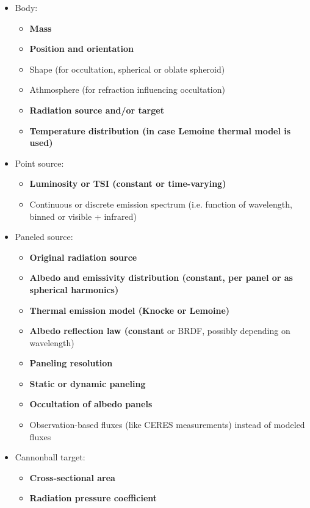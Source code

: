 \documentclass[parskip=full,DIV=15]{scrartcl}
\begin{document}
\begin{itemize}
   \item Body:
   \begin{itemize}
      \item \textbf{Mass}
      \item \textbf{Position and orientation}
      \item Shape (for occultation, spherical or oblate spheroid)
      \item Athmosphere (for refraction influencing occultation)
      \item \textbf{Radiation source and/or target}
      \item \textbf{Temperature distribution (in case Lemoine thermal model is used)}
   \end{itemize}
   \item Point source:
   \begin{itemize}
      \item \textbf{Luminosity or TSI (constant or time-varying)}
      \item Continuous or discrete emission spectrum (i.e. function of wavelength, binned or visible + infrared)
   \end{itemize}
   \item Paneled source:
   \begin{itemize}
      \item \textbf{Original radiation source}
      \item \textbf{Albedo and emissivity distribution (constant, per panel or as spherical harmonics)}
      \item \textbf{Thermal emission model (Knocke or Lemoine)}
      \item \textbf{Albedo reflection law (constant} or BRDF, possibly depending on wavelength)
      \item \textbf{Paneling resolution}
      \item \textbf{Static or dynamic paneling}
      \item \textbf{Occultation of albedo panels}
      \item Observation-based fluxes (like CERES measurements) instead of modeled fluxes
   \end{itemize}
   \item Cannonball target:
   \begin{itemize}
      \item \textbf{Cross-sectional area}
      \item \textbf{Radiation pressure coefficient}
   \end{itemize}

\end{itemize}
\end{document}
